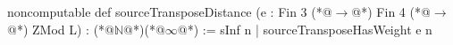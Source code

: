 noncomputable def sourceTransposeDistance (e : Fin 3 (*@$\to$@*) Fin 4 (*@$\to$@*) ZMod L) : (*@$\mathbb N$@*)(*@$\infty$@*) :=
  sInf {n | sourceTransposeHasWeight e n}
